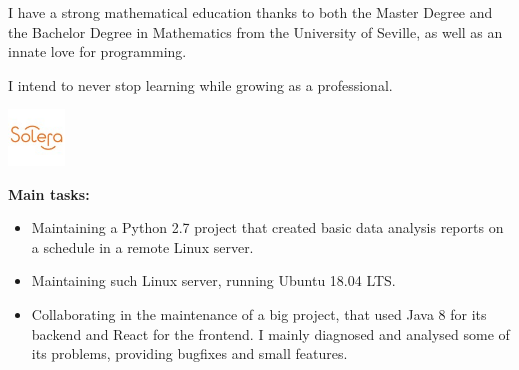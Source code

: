 \documentclass[10pt,a4paper]{altacv}
\begin{document}
\tagline{}

\begin{fullwidth}
\makecvheader
\end{fullwidth}

I have a strong mathematical education thanks to both the Master Degree and the Bachelor Degree in Mathematics from the University of Seville, as well as an innate love for programming.

I intend to never stop learning while growing as a professional. 
 
\begin{minipage}[t]{0.3\linewidth}
	\centering
  \includegraphics[width=15mm]{soleraInc.jpg}
\end{minipage}
\begin{minipage}[b]{0.69\linewidth}
\end{minipage}

\begin{addmargin}{2em}
\begin{small}
\textbf{Main tasks:}
\begin{itemize}
  \item Maintaining a Python 2.7 project that created basic data analysis reports on a schedule in a remote Linux server.
  \item Maintaining such Linux server, running Ubuntu 18.04 LTS.
  \item Collaborating in the maintenance of a big project, that used Java 8 for its backend and React for the frontend. I mainly diagnosed and analysed some of its problems, providing bugfixes and small features.
\end{itemize}
\end{small}
\end{addmargin}
\end{document}
